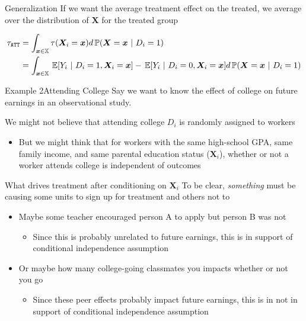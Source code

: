 \documentclass[aspectratio=169,t,11pt,table]{beamer}
\begin{document}
\begin{frame}{Generalization}
  If we want the average treatment effect on the treated, we average over the distribution of $\bm{X}$ for the treated group
  
  \vspace*{-\medskipamount}
  \begin{align*}
    \tau_{\texttt{ATT}} &= 
    \int_{\bm{x} \in \mathbb{X}} \tau(\bm{X}_i = \bm{x}) d\prob{\bm{X} = \bm{x}}{D_i = 1}\\ 
    &= \int_{\bm{x} \in \mathbb{X}} \expec{Y_i}{D_i = 1, \bm{X}_i = \bm{x}} - \expec{Y_i}{D_i = 0, \bm{X}_i = \bm{x}} d\prob{\bm{X} = \bm{x}}{D_i = 1}
  \end{align*}
\end{frame}

\begin{frame}{Example 2}{Attending College}
  Say we want to know the effect of college on future earnings in an observational study. 
  
  \bigskip
  We might not believe that attending college $D_i$ is randomly assigned to workers
  \begin{itemize}
    \item But we might think that for workers with the same high-school GPA, same family income, and same parental education status ($\bm{X}_i$), whether or not a worker attends college is independent of outcomes
  \end{itemize}
\end{frame}

\begin{frame}{What drives treatment after conditioning on $\bm{X}_i$}
  To be clear, \emph{something} must be causing some units to sign up for treatment and others not to
  \begin{itemize}
    \item Maybe some teacher encouraged person A to apply but person B was not 
    \begin{itemize}
      \item Since this is probably unrelated to future earnings, this is in support of conditional independence assumption
    \end{itemize}
    
    \pause
    \item Or maybe how many college-going classmates you impacts whether or not you go
    \begin{itemize}
      \item Since these peer effects probably impact future earnings, this is in not in support of conditional independence assumption
    \end{itemize}
  \end{itemize}
\end{frame}
\end{document}
